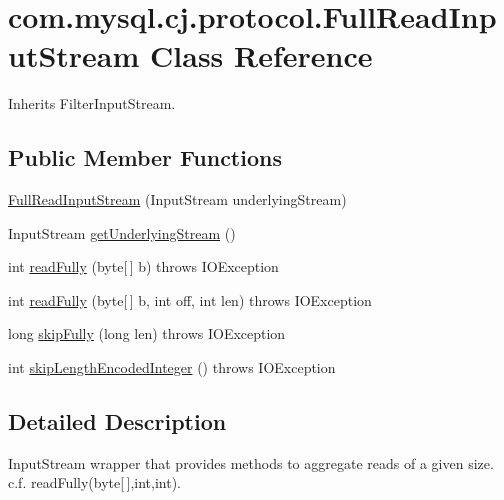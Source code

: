 \hypertarget{classcom_1_1mysql_1_1cj_1_1protocol_1_1_full_read_input_stream}{}\section{com.\+mysql.\+cj.\+protocol.\+Full\+Read\+Input\+Stream Class Reference}
\label{classcom_1_1mysql_1_1cj_1_1protocol_1_1_full_read_input_stream}


Inherits Filter\+Input\+Stream.

\subsection*{Public Member Functions}
\begin{DoxyCompactItemize}
\item 
\mbox{\hyperlink{classcom_1_1mysql_1_1cj_1_1protocol_1_1_full_read_input_stream_a130d34d6a6733b58df753dd2387398e3}{Full\+Read\+Input\+Stream}} (Input\+Stream underlying\+Stream)
\item 
Input\+Stream \mbox{\hyperlink{classcom_1_1mysql_1_1cj_1_1protocol_1_1_full_read_input_stream_a0d7c455b08cbaecf1bccf13332902e80}{get\+Underlying\+Stream}} ()
\item 
int \mbox{\hyperlink{classcom_1_1mysql_1_1cj_1_1protocol_1_1_full_read_input_stream_a99afc4ea0c7401e413b2a563118d8b54}{read\+Fully}} (byte\mbox{[}$\,$\mbox{]} b)  throws I\+O\+Exception 
\item 
int \mbox{\hyperlink{classcom_1_1mysql_1_1cj_1_1protocol_1_1_full_read_input_stream_aaa9ec02b3506e269f2c62e8a829244cd}{read\+Fully}} (byte\mbox{[}$\,$\mbox{]} b, int off, int len)  throws I\+O\+Exception 
\item 
long \mbox{\hyperlink{classcom_1_1mysql_1_1cj_1_1protocol_1_1_full_read_input_stream_ae18612336a0a065c22bcdf5da96f178b}{skip\+Fully}} (long len)  throws I\+O\+Exception 
\item 
int \mbox{\hyperlink{classcom_1_1mysql_1_1cj_1_1protocol_1_1_full_read_input_stream_a2fbcd02fc93bec4299d52e1f795a043c}{skip\+Length\+Encoded\+Integer}} ()  throws I\+O\+Exception 
\end{DoxyCompactItemize}


\subsection{Detailed Description}
Input\+Stream wrapper that provides methods to aggregate reads of a given size. c.\+f. read\+Fully(byte\mbox{[}$\,$\mbox{]},int,int). 

